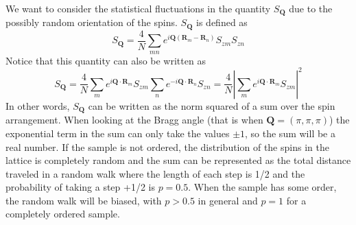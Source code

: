 \documentclass[11pt,letter]{article}
\newcommand{\bv}[1]{\ensuremath{\bm{#1}}}
\begin{document}
We want to consider the statistical fluctuations in the quantity $S_{\bv{Q}}$
due to the possibly random orientation of the spins.  $S_{\bv{Q}}$ is defined
as 
\begin{equation}
S_{\bv{Q}} =  
      \frac{4}{N}
      \sum_{mn}  
      e^{ i \bv{Q}( \bv{R}_{m} - \bv{R}_{n} ) }  
      S_{zm}S_{zn}
\end{equation}
Notice that this quantity can also be written as 
\begin{equation}
S_{\bv{Q}} =  
      \frac{4}{N}
      \sum_{m}  
      e^{ i \bv{Q} \cdot\bv{R}_{m}  }  
      S_{zm} 
      \sum_{n}  
      e^{ -i \bv{Q} \cdot\bv{R}_{n}  }  
      S_{zn} =  
      \frac{4}{N}
      \left| \sum_{m}  
      e^{ i \bv{Q} \cdot \bv{R}_{m} }  
      S_{zm} \right|^{2}
\end{equation}
In other words, $S_{\bv{Q}}$ can be written as the norm squared of a sum over
the spin arrangement.   When looking at the Bragg angle  (that is when $\bv{Q}
= (\pi,\pi,\pi)$) the exponential term in the sum can only take the values
$\pm1$, so the sum will be a real number.  If the sample is not ordered, the
distribution of the spins in the lattice is completely random and the sum can
be represented as the total distance traveled in a random walk where the length
of each step is 1/2 and the probability of taking a step +1/2 is  $p=0.5$.
When the sample has some order, the random walk will be biased,  with $p>0.5$
in general and $p=1$ for a completely ordered sample.
\end{document}
